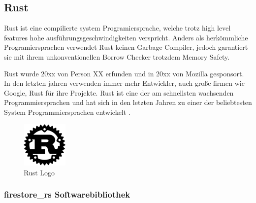 \subsection{Rust}

Rust ist eine compilierte system Programiersprache, welche trotz high level features hohe ausführungsgeschwindigkeiten verspricht. Anders als herkömmliche Programiersprachen verwendet Rust keinen Garbage Compiler, jedoch garantiert sie mit ihrem unkonventionellen Borrow Checker trotzdem Memory Safety.


Rust wurde 20xx von Person XX erfunden und in 20xx von Mozilla gesponsort\cite{rust}. In den letzten jahren verwenden immer mehr Entwickler, auch große firmen wie Google, Rust für ihre Projekte. Rust ist eine der am schnellsten wachsenden Programmiersprachen und hat sich in den letzten Jahren zu einer der beliebtesten System Programmiersprachen entwickelt \cite{stackoverflow_survey}.

\begin{figure}[ht]
  \centering
  \includegraphics[width=0.20\textwidth]{images/rust_logo.png}
  \caption{Rust Logo}
  \label{fig:rust_logo}
\end{figure}

\subsubsection{firestore\_rs Softwarebibliothek}